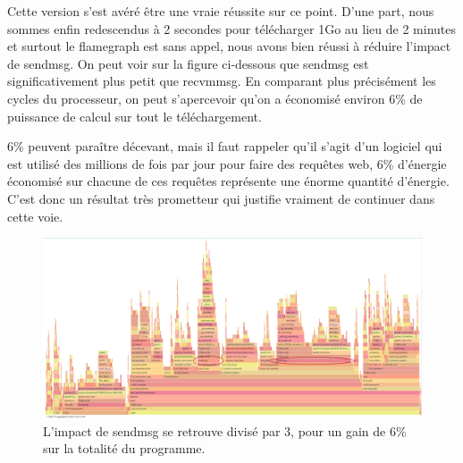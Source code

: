 Cette version s'est avéré être une vraie réussite sur ce point.
D'une part, nous sommes enfin redescendus à 2 secondes pour télécharger 1Go au lieu de 2 minutes et surtout le flamegraph est sans appel, nous avons bien réussi à réduire l'impact de sendmsg. On peut voir sur la figure ci-dessous que sendmsg est significativement plus petit que recvmmsg.
En comparant plus précisément les cycles du processeur, on peut s'apercevoir qu'on a économisé environ 6\% de puissance de calcul sur tout le téléchargement.

6\% peuvent paraître décevant, mais il faut rappeler qu'il s'agit d'un logiciel qui est utilisé des millions de fois par jour pour faire des requêtes web, 6\% d'énergie économisé sur chacune de ces requêtes représente une énorme quantité d'énergie. C'est donc un résultat très prometteur qui justifie vraiment de continuer dans cette voie.

\begin{figure}[H]
    \centering
    \includegraphics[width=\textwidth]{figures/flamegraph_delayed_ack.png}
    \caption{L'impact de sendmsg se retrouve divisé par 3, pour un gain de 6\% sur la totalité du programme.}
\end{figure}
